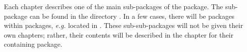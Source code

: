 \begin{FiPyDocumentationExample}
    
    \chapterheadstart
    {
     \afterchaptertitle
    }
    
    Each chapter describes one of the main sub-packages of the
     package.  The sub-package
     can be found in the
    directory .  In a few cases, there will be
    packages within packages, \emph{e.g.}
     located in
    .  These sub-sub-packages
    will not be given their own chapters; rather, their contents will
    be described in the chapter for their containing package.

    
\end{FiPyDocumentationExample}

\begin{FiPyDocumentationExample}
    
\end{FiPyDocumentationExample}

%     

